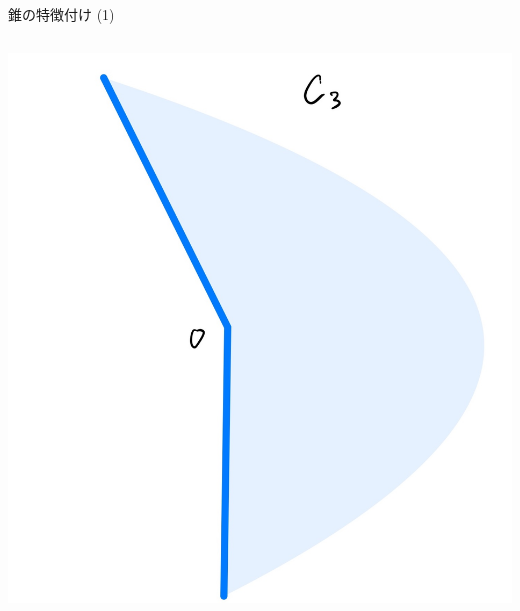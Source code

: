 \documentclass[aspectratio=169, dvipdfmx, 11pt]{beamer} %
\begin{document}
\begin{frame}{錐の特徴付け (1)}
\begin{columns}
\begin{column}{0.48\textwidth}
      \includegraphics[keepaspectratio, scale=0.06]{figures/cone_figure_3.jpg}
    \end{column}
  \end{columns}
\end{frame}
\end{document}
